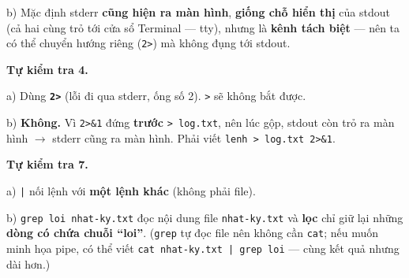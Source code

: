 \documentclass[12pt,a4paper]{article}
\newcommand{\cmd}[1]{\texttt{#1}}
\begin{document}
b) Mặc định stderr \textbf{cũng hiện ra màn hình}, \textbf{giống chỗ hiển thị} của stdout (cả hai cùng trỏ tới cửa sổ Terminal --- tty), nhưng là \textbf{kênh tách biệt} --- nên ta có thể chuyển hướng riêng (\cmd{2>}) mà không đụng tới stdout.

\textbf{Tự kiểm tra 4.}

a) Dùng \textbf{\cmd{2>}} (lỗi đi qua stderr, ống số 2). \cmd{>} sẽ không bắt được.

b) \textbf{Không.} Vì \cmd{2>\&1} đứng \textbf{trước} \cmd{> log.txt}, nên lúc gộp, stdout còn trỏ ra màn hình $\rightarrow$ stderr cũng ra màn hình. Phải viết \cmd{lenh > log.txt 2>\&1}.

\textbf{Tự kiểm tra 7.}

a) \cmd{|} nối lệnh với \textbf{một lệnh khác} (không phải file).

b) \cmd{grep loi nhat-ky.txt} đọc nội dung file \cmd{nhat-ky.txt} và \textbf{lọc} chỉ giữ lại những \textbf{dòng có chứa chuỗi ``loi''}. (\cmd{grep} tự đọc file nên không cần \cmd{cat}; nếu muốn minh họa pipe, có thể viết \cmd{cat nhat-ky.txt | grep loi} --- cùng kết quả nhưng dài hơn.)
\end{document}
